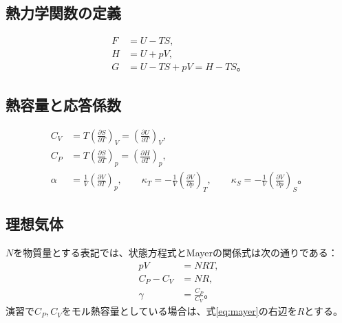 \documentclass[platex,dvipdfmx,a4paper,10pt]{jsarticle}
\begin{document}
\subsection{熱力学関数の定義}
\begin{align}
  F&=U-TS,\label{eq:Fdef}\\
  H&=U+pV,\label{eq:Hdef}\\
  G&=U-TS+pV=H-TS。\label{eq:Gdef}
\end{align}

\subsection{熱容量と応答係数}
\begin{align}
  C_V&=T\left(\frac{\partial S}{\partial T}\right)_V=\left(\frac{\partial U}{\partial T}\right)_V,\label{eq:Cv}\\
  C_P&=T\left(\frac{\partial S}{\partial T}\right)_p=\left(\frac{\partial H}{\partial T}\right)_p,\label{eq:Cp}\\
  \alpha&=\frac{1}{V}\left(\frac{\partial V}{\partial T}\right)_p,\qquad
  \kappa_T=-\frac{1}{V}\left(\frac{\partial V}{\partial p}\right)_T,\qquad
  \kappa_S=-\frac{1}{V}\left(\frac{\partial V}{\partial p}\right)_S。\label{eq:responses}
\end{align}

\subsection{理想気体}
$N$を物質量とする表記では、状態方程式とMayerの関係式は次の通りである：
\begin{align}
  pV&=NRT,\label{eq:ideal}\\
  C_P-C_V&=NR,\label{eq:mayer}\\
  \gamma&=\frac{C_P}{C_V}。\label{eq:gamma}
\end{align}
演習で$C_P,C_V$をモル熱容量としている場合は、式\eqref{eq:mayer}の右辺を$R$とする。

\newpage
\end{document}
